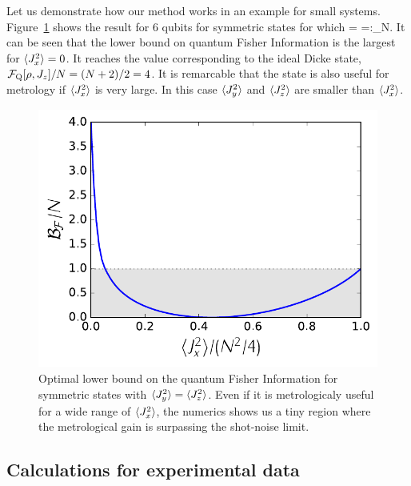 Let us demonstrate how our method works in an example for small systems.
Figure~\ref{fig:lt-symmetric-dicke-6-bound}
shows the result for 6 qubits for symmetric states for which
\be
  \label{eq:lt-maximum-angular-momentum}
   = =:_N.
\ee
It can be seen that the lower bound on quantum Fisher Information is the largest for $\langle{J_x^2}\rangle=0$.
It reaches the value corresponding to the ideal Dicke state, $\mathcal{F}_{\textnormal{Q}}[{\textstyle \rho,J_z}]/N=(N+2)/2=4$.
It is remarcable that the state is also useful for metrology if $\langle{J_x^2}\rangle$ is very large.
In this case $\langle{J_y^2}\rangle$ and $\langle{J_z^2}\rangle$ are smaller than $\langle{J_x^2}\rangle$.
\begin{figure}[htp]
  \centering
  \includegraphics[scale=.65]{img/LT_dicke_edge.pdf}
  \caption[Bound for 6-particles with BEC symmetry for $\{\expect{J_x^2},\expect{J_y^2},\expect{J_z^2}\}$ are measured]{
  Optimal lower bound on the quantum Fisher Information for symmetric states with $\langle{J_y^2}\rangle=\langle{J_z^2}\rangle$. Even if it is metrologicaly useful for a wide range of $\langle{J_x^2}\rangle$, the numerics shows us a tiny region where the metrological gain is surpassing the shot-noise limit.}
  \label{fig:lt-symmetric-dicke-6-bound}
\end{figure}

\subsection{Calculations for experimental data}

